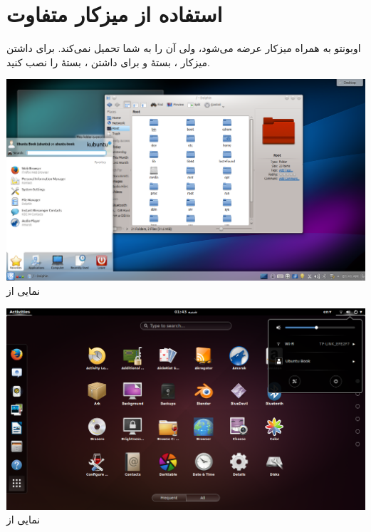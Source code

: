 \section{استفاده از میزکار متفاوت}
اوبونتو به همراه میزکار  عرضه می‌شود، ولی آن را به شما تحمیل نمی‌کند. برای داشتن میزکار ، بستهٔ  و برای داشتن ، بستهٔ  را نصب کنید.

\begin{center}
\includegraphics[scale=0.45]{pics/32.png}\\
نمایی از \\
\end{center}

\begin{center}
\includegraphics[scale=0.33]{pics/33.png}\\
نمایی از 
\end{center}

